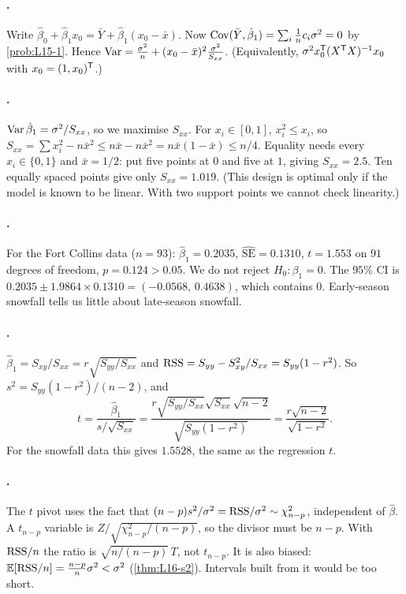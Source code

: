 \paragraph{.}
Write $\hat\beta_0+\hat\beta_1x_0=\bar Y+\hat\beta_1(x_0-\bar x)$. Now
$\operatorname{Cov}(\bar Y,\hat\beta_1)=\sum_i\frac1n c_i\sigma^2=0$ by \cref{prob:L15-1}. Hence
$\operatorname{Var}=\frac{\sigma^2}n+(x_0-\bar x)^2\frac{\sigma^2}{S_{xx}}$. (Equivalently, $\sigma^2 x_0^{\mathsf T}(X^{\mathsf T} X)^{-1}x_0$ with $x_0=(1,x_0)^{\mathsf T}$.)

\paragraph{.}
$\operatorname{Var}\hat\beta_1=\sigma^2/S_{xx}$, so we maximise $S_{xx}$. For $x_i\in[0,1]$, $x_i^2\le x_i$, so
$S_{xx}=\sum x_i^2-n\bar x^2\le n\bar x-n\bar x^2=n\bar x(1-\bar x)\le n/4$. Equality needs every $x_i\in\{0,1\}$ and
$\bar x=1/2$: put five points at $0$ and five at $1$, giving $S_{xx}=2.5$. Ten equally spaced points give only $S_{xx}=1.019$.
(This design is optimal only if the model is known to be linear. With two support points we cannot check linearity.)

\paragraph{.}
For the Fort Collins data ($n=93$): $\hat\beta_1=0.2035$, $\widehat{\mathrm{SE}}=0.1310$, $t=1.553$ on $91$ degrees of freedom,
$p=0.124>0.05$. We do not reject $H_0:\beta_1=0$. The $95\%$ CI is $0.2035\pm1.9864\times0.1310=(-0.0568,\,0.4638)$, which
contains $0$. Early-season snowfall tells us little about late-season snowfall.

\paragraph{.}
$\hat\beta_1=S_{xy}/S_{xx}=r\sqrt{S_{yy}/S_{xx}}$ and $\mathrm{RSS}=S_{yy}-S_{xy}^2/S_{xx}=S_{yy}(1-r^2)$. So
$s^2=S_{yy}(1-r^2)/(n-2)$, and
\[
t=\frac{\hat\beta_1}{s/\sqrt{S_{xx}}}=\frac{r\sqrt{S_{yy}/S_{xx}}\sqrt{S_{xx}}\sqrt{n-2}}{\sqrt{S_{yy}(1-r^2)}}=\frac{r\sqrt{n-2}}{\sqrt{1-r^2}}.
\]
For the snowfall data this gives $1.5528$, the same as the regression $t$.

\paragraph{.}
The $t$ pivot uses the fact that $(n-p)s^2/\sigma^2=\mathrm{RSS}/\sigma^2\sim\chi^2_{n-p}$, independent of $\hat\beta$. A $t_{n-p}$ variable is
$Z/\sqrt{\chi^2_{n-p}/(n-p)}$, so the divisor must be $n-p$. With $\mathrm{RSS}/n$ the ratio is $\sqrt{n/(n-p)}\,T$, not $t_{n-p}$. It is
also biased: $\mathbb E[\mathrm{RSS}/n]=\frac{n-p}{n}\sigma^2<\sigma^2$ (\cref{thm:L16-s2}). Intervals built from it would be too short.

